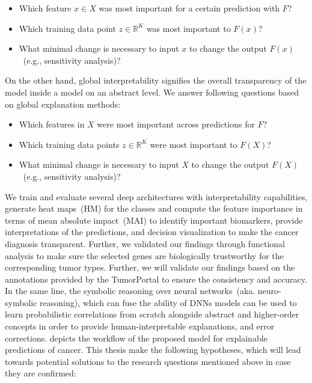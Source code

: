 \begin{itemize}[noitemsep]
    \item Which feature $x \in X$ was most important for a certain prediction with $F$? 
    \item Which training data point $z \in \mathbb{R}^{K}$ was most important to $F(x)$? 
    \item What minimal change is necessary to input $x$ to change the output $F(x)$~(e.g., sensitivity analysis)? 
\end{itemize}

\hspace*{3.5mm} On the other hand, global interpretability signifies the overall transparency of the model inside a model on an abstract level. We answer following questions based on global explanation methods: 

\begin{itemize}[noitemsep]
    \item Which features in $X$ were most important across predictions for $F$? 
    \item Which training data points $z \in \mathbb{R}^{K}$ were most important to $F(X)$? 
    \item What minimal change is necessary to input $X$ to change the output $F(X)$~(e.g., sensitivity analysis)? 
\end{itemize}

\hspace*{3.5mm} We train and evaluate several deep architectures with interpretability capabilities, generate heat maps~(HM) for the classes and compute the feature importance in terms of mean absolute impact~(MAI) to identify important biomarkers, provide interpretations of the predictions, and decision visualization to make the cancer diagnosis transparent. Further, we validated our findings through functional analysis to make sure the selected genes are biologically trustworthy for the corresponding tumor types. Further, we will validate our findings based on the annotations provided by the TumorPortal to ensure the consistency and accuracy. In the same line, the symbolic reasoning over neural networks~(aka. neuro-symbolic reasoning), which can fuse the ability of DNNs models can be used to learn probabilistic correlations from scratch alongside abstract and higher-order concepts in order to provide human-interpretable explanations, and error corrections.  depicts the workflow of the proposed model for explainable predictions of cancer. This thesis make the following hypotheses, which will lead towards potential solutions to the research questions mentioned above in case they are confirmed:

